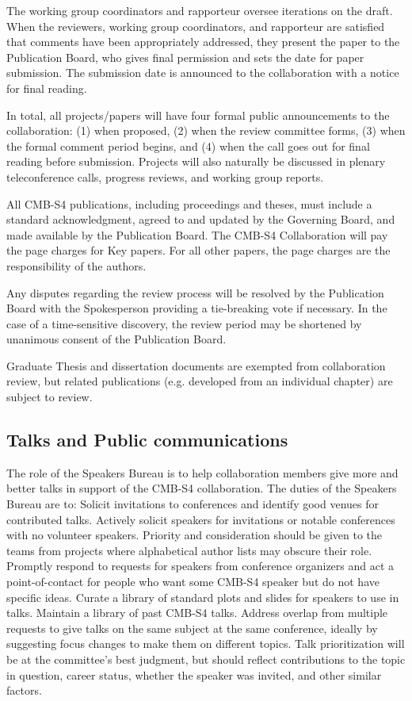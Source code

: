 The working group coordinators and rapporteur oversee iterations on the draft.  When the reviewers, working group coordinators, and rapporteur are satisfied that comments have been appropriately addressed, they present the paper to the Publication Board, who gives final permission and sets the date for paper submission.  The submission date is announced to the collaboration with a notice for final reading.  

In total, all projects/papers will have four formal public announcements to the collaboration: (1) when proposed, (2) when the review committee forms, (3) when the formal comment period begins, and (4) when the call goes out for final reading before submission.  Projects will also naturally be discussed in plenary teleconference calls, progress reviews, and working group reports.

All CMB-S4 publications, including proceedings and theses, must include a standard acknowledgment, agreed to and updated by the Governing Board, and made available by the Publication Board.  The CMB-S4 Collaboration will pay the page charges for Key papers. For all other papers, the page charges are the responsibility of the authors.

Any disputes regarding the review process will be resolved by the Publication Board with the Spokesperson providing a tie-breaking vote if necessary. In the case of a time-sensitive discovery, the review period may be shortened by unanimous consent of the Publication Board.

Graduate Thesis and dissertation documents are exempted from collaboration review, but related publications (e.g. developed from an individual chapter) are subject to review.

\subsection{Talks and Public communications}

The role of the Speakers Bureau is to help collaboration members give more and better talks in support of the CMB-S4 collaboration. The duties of the Speakers Bureau are to:
Solicit invitations to conferences and identify good venues for contributed talks.
Actively solicit speakers for invitations or notable conferences with no volunteer speakers. Priority and consideration should be given to the teams from projects where alphabetical author lists may obscure their role. 
Promptly respond to requests for speakers from conference organizers and act a point-of-contact for people who want some CMB-S4 speaker but do not have specific ideas.
Curate a library of standard plots and slides for speakers to use in talks.
Maintain a library of past CMB-S4 talks.
Address overlap from multiple requests to give talks on the same subject at the same conference, ideally by suggesting focus changes to make them on different topics. Talk prioritization will be at the committee's best judgment, but should reflect contributions to the topic in question, career status, whether the speaker was invited, and other similar factors.

